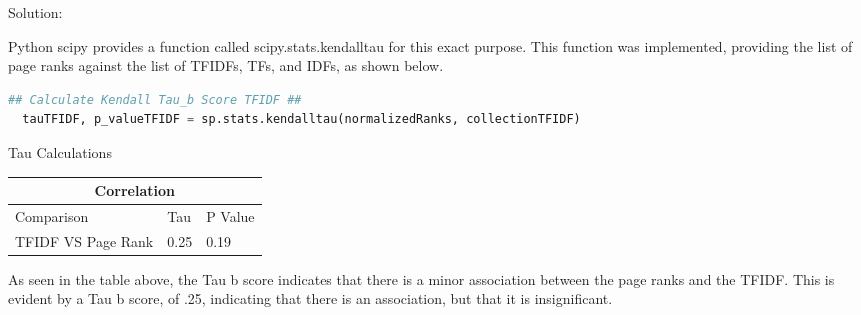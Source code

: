 \documentclass[11pt]{scrartcl} %
\begin{document}
\LARGE Solution:
\newline \newline\small

\tabto{2.0cm} Python scipy provides a function called scipy.stats.kendalltau for this exact purpose. This function was implemented, providing the list of page ranks against the list of TFIDFs, TFs, and IDFs, as shown below. 

\begin{lstlisting}[language = Python, caption=Word Count and Count for Query Term]
  ## Calculate Kendall Tau_b Score TFIDF ##
  tauTFIDF, p_valueTFIDF = sp.stats.kendalltau(normalizedRanks, collectionTFIDF)
\end{lstlisting}

\begin{center}
\begin{LARGE} \tabto{1cm}Tau Calculations \end{LARGE} \newline \newline
\begin{tabular}{ |p{3cm}||p{2cm}|p{2cm}|  }
 \hline
 \multicolumn{3}{|c|}{Correlation} \\
 \hline
 Comparison & Tau & P Value\\
 \hline
TFIDF VS Page Rank & 0.25 &  0.19 \\
 \hline
\end{tabular}
\end{center}
\tabto{2.0cm} As seen in the table above, the Tau b score indicates that there is a minor association between the page ranks and the TFIDF. This is evident by a Tau b score, of .25, indicating that there is an association, but that it is insignificant. 
\end{document}
